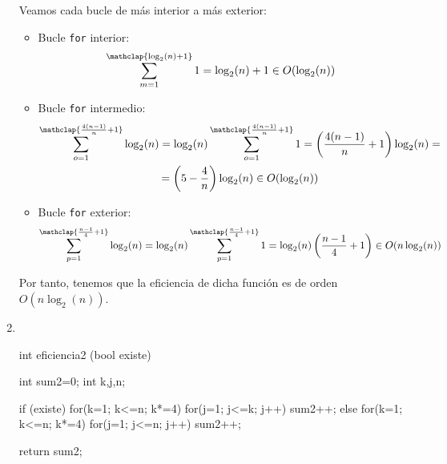\begin{ejercicio}
\begin{enumerate}[label=\alph*)]
        Veamos cada bucle de más interior a más exterior:
        \begin{itemize}
            \item Bucle \verb|for| interior:
            \begin{equation*}
                \sum_{m=1}^{\mathclap{\log_2(n)+1}}1 = \log_2(n)+1\in O(\log_2(n))
            \end{equation*}

            \item Bucle \verb|for| intermedio:
            \begin{multline*}
                \sum_{o=1}^{\mathclap{\frac{4(n-1)}{n} + 1}} \log_2(n) = \log_2(n) \sum_{o=1}^{\mathclap{\frac{4(n-1)}{n} + 1}} 1 = \left(\frac{4(n-1)}{n}+1\right) \log_2(n)  =\\= \left( 5 - \frac{4}{n}\right) \log_2(n) \in O(\log_2(n))
            \end{multline*}

            \item Bucle \verb|for| exterior:
            \begin{equation*}
                \sum_{p=1}^{\mathclap{\frac{n-1}{4} +1}} \log_2(n) = \log_2(n)  \sum_{p=1}^{\mathclap{\frac{n-1}{4} +1}} 1 = \log_2(n) \left(\frac{n-1}{4}+1\right) \in O(n \log_2(n))
            \end{equation*}
        \end{itemize}

        Por tanto, tenemos que la eficiencia de dicha función es de orden $O(n\log_2(n))$.

        \item \
        \begin{listing}[H]
        \begin{cppcode}
int eficiencia2 (bool existe){
    int sum2=0; int k,j,n;
    
    if (existe)
        for(k=1; k<=n; k*=4)
            for(j=1; j<=k; j++)
                sum2++;
    else
        for(k=1; k<=n; k*=4)
            for(j=1; j<=n; j++)
                sum2++;
    
    return sum2;
}
        \end{cppcode}
        \end{listing}


\end{enumerate}
\end{ejercicio}

